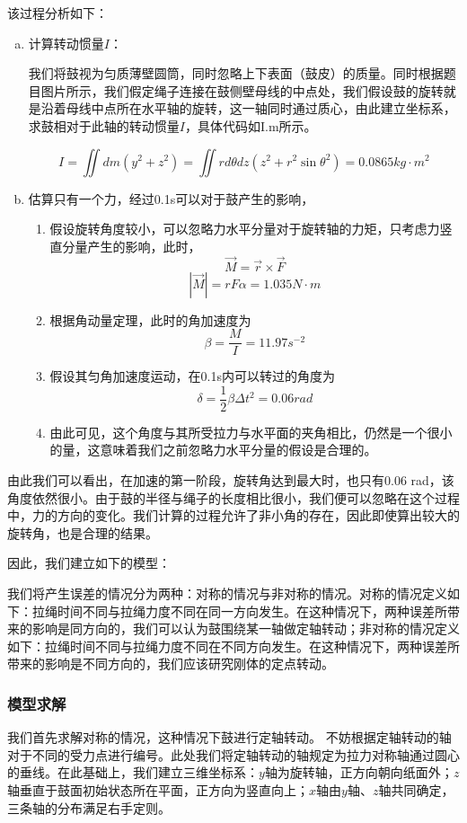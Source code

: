 \documentclass[nocover]{cumcmart}%
\begin{document}
该过程分析如下：

\begin{enumerate}[(a)]
    \item 
计算转动惯量$I$：

我们将鼓视为匀质薄壁圆筒，同时忽略上下表面（鼓皮）的质量。同时根据题目图片所示，我们假定绳子连接在鼓侧壁母线的中点处，我们假设鼓的旋转就是沿着母线中点所在水平轴的旋转，这一轴同时通过质心，由此建立坐标系，求鼓相对于此轴的转动惯量$I$，具体代码如I.m所示。


$$I = \iint dm(y^2 + z^2) = \iint  rd\theta dz (z^2 + r^2 \sin{\theta}^2) = 0.0865 kg\cdot m^2$$
\item 估算只有一个力，经过0.1s可以对于鼓产生的影响，
\begin{enumerate}
    \item 假设旋转角度较小，可以忽略力水平分量对于旋转轴的力矩，只考虑力竖直分量产生的影响，此时，
    $$\vec{M} = \vec{r}\times \vec{F}$$
    $$|\vec{M}| = rF\alpha = 1.035 N\cdot m$$
    \item 根据角动量定理，此时的角加速度为
    $$\beta = \frac{M}{I} = 11.97 s^{-2}$$
    \item 假设其匀角加速度运动，在0.1s内可以转过的角度为
    $$\delta = \frac{1}{2}\beta \Delta t^2 = 0.06 rad$$
    \item 由此可见，这个角度与其所受拉力与水平面的夹角相比，仍然是一个很小的量，这意味着我们之前忽略力水平分量的假设是合理的。
\end{enumerate}
\end{enumerate}

由此我们可以看出，在加速的第一阶段，旋转角达到最大时，也只有0.06 rad，该角度依然很小。由于鼓的半径与绳子的长度相比很小，我们便可以忽略在这个过程中，力的方向的变化。我们计算的过程允许了非小角的存在，因此即使算出较大的旋转角，也是合理的结果。

因此，我们建立如下的模型：

我们将产生误差的情况分为两种：对称的情况与非对称的情况。对称的情况定义如下：拉绳时间不同与拉绳力度不同在同一方向发生。在这种情况下，两种误差所带来的影响是同方向的，我们可以认为鼓围绕某一轴做定轴转动；非对称的情况定义如下：拉绳时间不同与拉绳力度不同在不同方向发生。在这种情况下，两种误差所带来的影响是不同方向的，我们应该研究刚体的定点转动。

\subsubsection{模型求解}
我们首先求解对称的情况，这种情况下鼓进行定轴转动。
不妨根据定轴转动的轴对于不同的受力点进行编号。此处我们将定轴转动的轴规定为拉力对称轴通过圆心的垂线。在此基础上，我们建立三维坐标系：$y$轴为旋转轴，正方向朝向纸面外；$z$轴垂直于鼓面初始状态所在平面，正方向为竖直向上；$x$轴由$y$轴、$z$轴共同确定，三条轴的分布满足右手定则。
\end{document}
